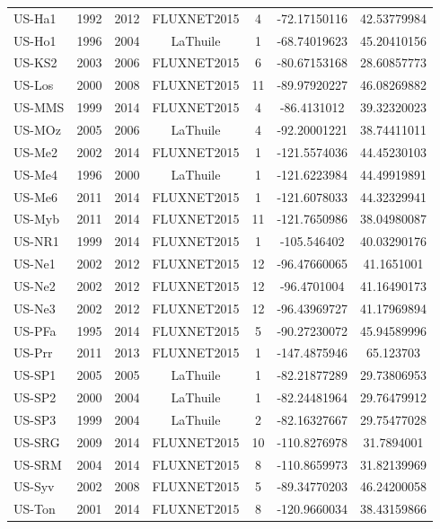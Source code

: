 \begin{center}
\begin{longtable}{lcccccc}
US-Ha1 & 1992 & 2012 & FLUXNET2015 & 4      & -72.17150116 & 42.53779984  \\
US-Ho1 & 1996 & 2004 & LaThuile    & 1      & -68.74019623 & 45.20410156  \\
US-KS2 & 2003 & 2006 & FLUXNET2015 & 6      & -80.67153168 & 28.60857773  \\
US-Los & 2000 & 2008 & FLUXNET2015 & 11     & -89.97920227 & 46.08269882  \\
US-MMS & 1999 & 2014 & FLUXNET2015 & 4      & -86.4131012  & 39.32320023  \\
US-MOz & 2005 & 2006 & LaThuile    & 4      & -92.20001221 & 38.74411011  \\
US-Me2 & 2002 & 2014 & FLUXNET2015 & 1      & -121.5574036 & 44.45230103  \\
US-Me4 & 1996 & 2000 & LaThuile    & 1      & -121.6223984 & 44.49919891  \\
US-Me6 & 2011 & 2014 & FLUXNET2015 & 1      & -121.6078033 & 44.32329941  \\
US-Myb & 2011 & 2014 & FLUXNET2015 & 11     & -121.7650986 & 38.04980087  \\
US-NR1 & 1999 & 2014 & FLUXNET2015 & 1      & -105.546402  & 40.03290176  \\
US-Ne1 & 2002 & 2012 & FLUXNET2015 & 12     & -96.47660065 & 41.1651001   \\
US-Ne2 & 2002 & 2012 & FLUXNET2015 & 12     & -96.4701004  & 41.16490173  \\
US-Ne3 & 2002 & 2012 & FLUXNET2015 & 12     & -96.43969727 & 41.17969894  \\
US-PFa & 1995 & 2014 & FLUXNET2015 & 5      & -90.27230072 & 45.94589996  \\
US-Prr & 2011 & 2013 & FLUXNET2015 & 1      & -147.4875946 & 65.123703    \\
US-SP1 & 2005 & 2005 & LaThuile    & 1      & -82.21877289 & 29.73806953  \\
US-SP2 & 2000 & 2004 & LaThuile    & 1      & -82.24481964 & 29.76479912  \\
US-SP3 & 1999 & 2004 & LaThuile    & 2      & -82.16327667 & 29.75477028  \\
US-SRG & 2009 & 2014 & FLUXNET2015 & 10     & -110.8276978 & 31.7894001   \\
US-SRM & 2004 & 2014 & FLUXNET2015 & 8      & -110.8659973 & 31.82139969  \\
US-Syv & 2002 & 2008 & FLUXNET2015 & 5      & -89.34770203 & 46.24200058  \\
US-Ton & 2001 & 2014 & FLUXNET2015 & 8      & -120.9660034 & 38.43159866  \\

\end{longtable}
\end{center}
